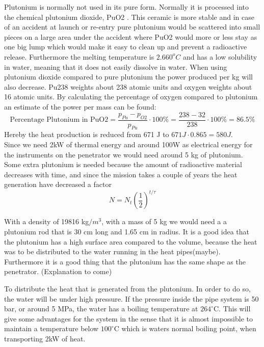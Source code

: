 \noindent
Plutonium is normally not used in its pure form. Normally it is processed into the chemical plutonium dioxide, PuO2 \cite{website:plutoniumoxide}. This ceramic is more stable and in case of an accident at launch or re-entry pure plutonium would be scattered into small pieces on a large area under the accident where PuO2 would more or less stay as one big lump which would make it easy to clean up and prevent a radioactive release. Furthermore the melting temperature is $2.660^oC$ and has a low solubility in water, meaning that it does not easily dissolve in water. When using plutonium dioxide compared to pure plutonium the power produced per kg will also decrease. Pu238 weights about 238 atomic units and oxygen weights about 16 atomic units. By calculating the percentage of oxygen compared to plutonium an estimate of the power per mass can be found: 
\begin{equation}
\text{Percentage Plutonium in PuO2} = \frac{p_{Pu} - p_{O2}}{p_{Pu}}\cdot 100\% = \frac{238 - 32}{238}\cdot 100\% = 86.5\% 
\end{equation}
Hereby the heat production is reduced from 671 J to $671J \cdot 0.865 = 580 J$. \\



\noindent
Since we need 2kW of thermal energy and around 100W as electrical energy for the instruments on the penetrator we would need around 5 kg of plutonium. Some extra plutonium is needed because the amount of radioactive material decreases with time, and since the mission takes a couple of years the heat generation have decreased a factor 
\begin{equation}
N = N_t \left(\frac{1}{2}\right)^{t/\tau} 
\end{equation}

\noindent
With a density of 19816 kg$/m^3$, with a mass of 5 kg we would need a a plutonium rod that is 30 cm long and 1.65 cm in radius. It is a good idea that the plutonium has a high surface area compared to the volume, because the heat was to be distributed to the water running in the heat pipes(maybe). Furthermore it is a good thing that the plutonium has the same shape as the penetrator. (Explanation to come) 


To distribute the heat that is generated from the plutonium. In order to do so, the water will be under high pressure. If the pressure inside the pipe system is 50 bar, or around 5 MPa, the water has a boiling temperature at $264^\circ$C. This will give some advantages for the system in the sense that it is almost impossible to maintain a temperature below $100^\circ$C which is waters normal boiling point, when transporting 2kW of heat.\\

